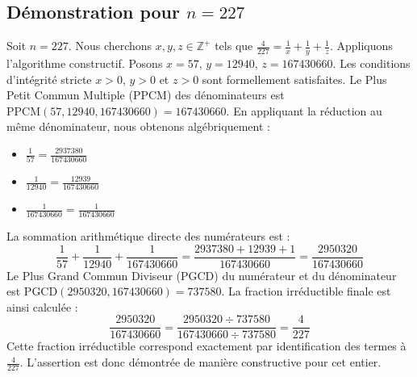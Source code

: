 \documentclass[11pt,a4paper]{article}
\begin{document}
\subsection{Démonstration pour $n = 227$}
Soit $n = 227$. Nous cherchons $x, y, z \in \mathbb{Z}^{+}$ tels que $\frac{4}{227} = \frac{1}{x} + \frac{1}{y} + \frac{1}{z}$.
Appliquons l'algorithme constructif. Posons $x = 57$, $y = 12940$, $z = 167430660$.
Les conditions d'intégrité stricte $x > 0$, $y > 0$ et $z > 0$ sont formellement satisfaites.
Le Plus Petit Commun Multiple (PPCM) des dénominateurs est $\text{PPCM}(57, 12940, 167430660) = 167430660$.
En appliquant la réduction au même dénominateur, nous obtenons algébriquement :
\begin{itemize}
    \item $\frac{1}{57} = \frac{2937380}{167430660}$
    \item $\frac{1}{12940} = \frac{12939}{167430660}$
    \item $\frac{1}{167430660} = \frac{1}{167430660}$
\end{itemize}
La sommation arithmétique directe des numérateurs est :
$$ \frac{1}{57} + \frac{1}{12940} + \frac{1}{167430660} = \frac{2937380 + 12939 + 1}{167430660} = \frac{2950320}{167430660} $$
Le Plus Grand Commun Diviseur (PGCD) du numérateur et du dénominateur est $\text{PGCD}(2950320, 167430660) = 737580$.
La fraction irréductible finale est ainsi calculée :
$$ \frac{2950320}{167430660} = \frac{2950320 \div 737580}{167430660 \div 737580} = \frac{4}{227} $$
Cette fraction irréductible correspond exactement par identification des termes à $\frac{4}{227}$. L'assertion est donc démontrée de manière constructive pour cet entier.
\end{document}
